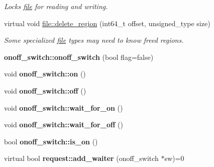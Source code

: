 \begin{CompactItemize}
\begin{CompactList}\small\item\em Locks \hyperlink{classfile}{file} for reading and writing. \item\end{CompactList}\item 
\hypertarget{group__iolayer_g1bb12d404c9a31564ba2c3c3e870ac49}{
virtual void \hyperlink{group__iolayer_g1bb12d404c9a31564ba2c3c3e870ac49}{file::delete\_\-region} (int64\_\-t offset, unsigned\_\-type size)}
\label{group__iolayer_g1bb12d404c9a31564ba2c3c3e870ac49}

\begin{CompactList}\small\item\em Some specialized \hyperlink{classfile}{file} types may need to know freed regions. \item\end{CompactList}\item 
\hypertarget{group__iolayer_gb53230fbb250ae81e9ed8c2415b341ad}{
\textbf{onoff\_\-switch::onoff\_\-switch} (bool flag=false)}
\label{group__iolayer_gb53230fbb250ae81e9ed8c2415b341ad}

\item 
\hypertarget{group__iolayer_g162d6c2d9d285aeb1b7d99ffd3833ff7}{
void \textbf{onoff\_\-switch::on} ()}
\label{group__iolayer_g162d6c2d9d285aeb1b7d99ffd3833ff7}

\item 
\hypertarget{group__iolayer_g722488338e6da8daf4d97ef3693cb4ea}{
void \textbf{onoff\_\-switch::off} ()}
\label{group__iolayer_g722488338e6da8daf4d97ef3693cb4ea}

\item 
\hypertarget{group__iolayer_g8deb7fd911f24be99cd91a40132a65fd}{
void \textbf{onoff\_\-switch::wait\_\-for\_\-on} ()}
\label{group__iolayer_g8deb7fd911f24be99cd91a40132a65fd}

\item 
\hypertarget{group__iolayer_gf038fd7a0ab14cd1779c823545a088e9}{
void \textbf{onoff\_\-switch::wait\_\-for\_\-off} ()}
\label{group__iolayer_gf038fd7a0ab14cd1779c823545a088e9}

\item 
\hypertarget{group__iolayer_g579840d81d7f0af3a24f7f3aaaad44c5}{
bool \textbf{onoff\_\-switch::is\_\-on} ()}
\label{group__iolayer_g579840d81d7f0af3a24f7f3aaaad44c5}

\item 
\hypertarget{group__iolayer_g2f72232aa958b26b36b04c2ade02b1d6}{
virtual bool \textbf{request::add\_\-waiter} (onoff\_\-switch $\ast$sw)=0}
\label{group__iolayer_g2f72232aa958b26b36b04c2ade02b1d6}


\end{CompactItemize}
